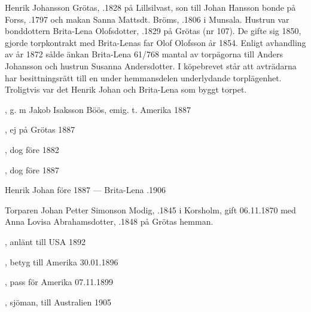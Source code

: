 %
Henrik Johansson Grötas, .1828 på Lillsilvast, son till Johan Hansson bonde på Forss, .1797 och makan Sanna Mattsdt. Bröms, .1806 i Munsala. Hustrun var bonddottern Brita-Lena Olofsdotter, .1829 på Grötas (nr 107). De gifte sig 1850, gjorde torpkontrakt med Brita-Lenas far Olof Olofsson år 1854. Enligt avhandling av år 1872 sålde änkan Brita-Lena 61/768 mantal av torpägorna till Anders Johansson och hustrun Susanna Andersdotter. I köpebrevet står att avträdarna har besittningsrätt till en under hemmansdelen underlydande torplägenhet. Troligtvis var det Henrik Johan och Brita-Lena som byggt torpet.
\begin{jhchildren}
  \item {}
  \item {}, g. m Jakob Isaksson Böös, emig. t. Amerika 1887
  \item {}
  \item {}
  \item {}
  \item {}, ej på Grötas 1887
  \item {}, dog före 1882
  \item {}, dog före 1887
\end{jhchildren}
Henrik Johan \textdied före 1887  ---  Brita-Lena .1906



%


%
Torparen Johan Petter Simonson Modig, .1845 i Korsholm, gift 06.11.1870 med Anna Lovisa Abrahamsdotter,  .1848 på Grötas hemman.
\begin{jhchildren}
  \item {}, anlänt till USA 1892
  \item {}, betyg till Amerika 30.01.1896
  \item {}, pass för Amerika 07.11.1899
  \item {}, sjöman, till Australien 1905
\end{jhchildren}

